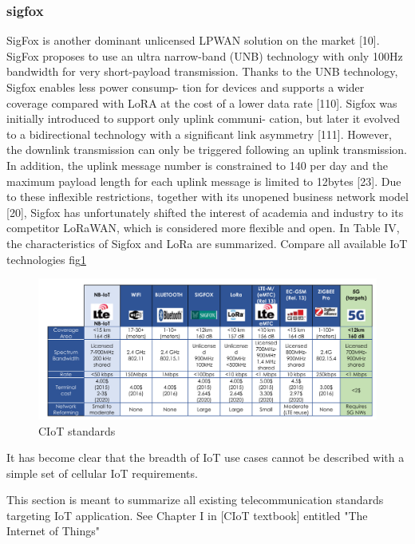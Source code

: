 \documentclass[conference]{IEEEtran}
\begin{document}
\subsubsection{sigfox}
\label{sec:1-2-2}
SigFox is another dominant unlicensed LPWAN
solution on the market [10]. SigFox proposes to use an
ultra narrow-band (UNB) technology with only 100Hz
bandwidth for very short-payload transmission. Thanks to
the UNB technology, Sigfox enables less power consump-
tion for devices and supports a wider coverage compared
with LoRA at the cost of a lower data rate [110]. Sigfox
was initially introduced to support only uplink communi-
cation, but later it evolved to a bidirectional technology
with a significant link asymmetry [111]. However, the
downlink transmission can only be triggered following
an uplink transmission. In addition, the uplink message
number is constrained to 140 per day and the maximum
payload length for each uplink message is limited to
12bytes [23]. Due to these inflexible restrictions, together
with its unopened business network model [20], Sigfox
has unfortunately shifted the interest of academia and
industry to its competitor LoRaWAN, which is considered
more flexible and open. In Table IV, the characteristics
of Sigfox and LoRa are summarized.
Compare all available IoT technologies fig\ref{fig:all-iot}




\begin{figure}
    \centering
    \includegraphics[width=\linewidth]{Pictures/IoT standards.png}
    \caption{CIoT standards}
    \label{fig:all-iot}
\end{figure}





It has become clear that the breadth of IoT use cases cannot be described with a simple set of cellular IoT requirements.


This section is meant to summarize all existing telecommunication standards targeting IoT application. See Chapter I in [CIoT textbook] \cite{liberg_cellular_2019} entitled "The Internet of Things"
\end{document}
